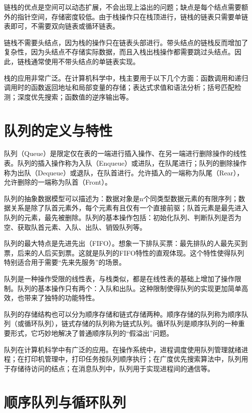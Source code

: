 \documentclass[12pt, a4paper]{article}
\begin{document}
链栈的优点是空间可以动态扩展，不会出现上溢出的问题；缺点是每个结点需要额外的指针空间，存储密度较低。由于栈操作只在栈顶进行，链栈的链表只需要单链表即可，不需要双向链表或循环链表。

链栈不需要头结点，因为栈的操作只在链表头部进行。带头结点的链栈反而增加了复杂性，因为头结点不存储实际数据，而且入栈出栈操作都需要跳过头结点。因此，链栈通常使用不带头结点的单链表实现。

栈的应用非常广泛。在计算机科学中，栈主要用于以下几个方面：函数调用和递归调用时的函数返回地址和局部变量的存储；表达式求值和语法分析；括号匹配检测；深度优先搜索；函数值的逆序输出等。

\section{队列的定义与特性}

队列（Queue）是限定仅在表的一端进行插入操作、在另一端进行删除操作的线性表。队列的插入操作称为入队（Enqueue）或进队，在队尾进行；队列的删除操作称为出队（Dequeue）或退队，在队首进行。允许插入的一端称为队尾（Rear），允许删除的一端称为队首（Front）。

队列的抽象数据模型可以描述为：数据对象是n个同类型数据元素的有限序列；数据关系是除了队首元素外，每个元素有且仅有一个直接前驱；队首元素是最先进入队列的元素，最先被删除。队列的基本操作包括：初始化队列、判断队列是否为空、获取队首元素、入队、出队、销毁队列等。

队列的最大特点是先进先出（FIFO）。想象一下排队买票：最先排队的人最先买到票，后来的人后买到票。这就是队列的FIFO特性的直观体现。这个特性使得队列特别适合用于需要“先来先服务”的场景。

队列是一种操作受限的线性表，与栈类似，都是在线性表的基础上增加了操作限制。队列的基本操作只有两个：入队和出队。这种限制使得队列的实现更加简单高效，也带来了独特的功能特性。

队列的存储结构也可以分为顺序存储和链式存储两种。顺序存储的队列称为顺序队列（或循环队列），链式存储的队列称为链式队列。循环队列是顺序队列的一种重要形式，它巧妙地解决了普通顺序队列的“假溢出”问题。

队列在计算机科学中有广泛的应用。在操作系统中，进程调度使用队列管理就绪进程；在打印机管理中，打印任务按队列顺序执行；在广度优先搜索算法中，队列用于存储待访问的结点；在消息队列中，队列用于实现进程间的通信等。

\section{顺序队列与循环队列}
\end{document}

